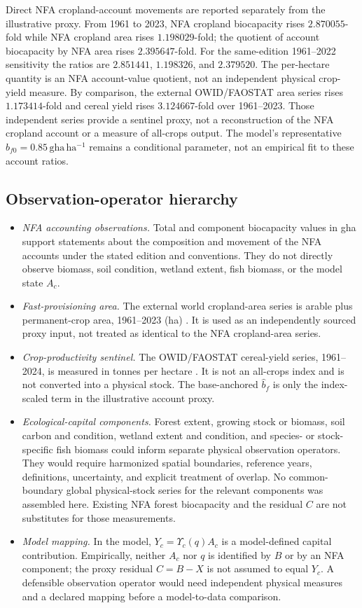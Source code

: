 \documentclass[11pt,a4paper]{article}
\newcommand{\Ups}{\Upsilon_c}
\begin{document}
Direct NFA cropland-account movements are reported separately from the illustrative proxy. From 1961 to 2023, NFA cropland biocapacity rises $2.870055$-fold while NFA cropland area rises $1.198029$-fold; the quotient of account biocapacity by NFA area rises $2.395647$-fold. For the same-edition 1961--2022 sensitivity the ratios are $2.851441$, $1.198326$, and $2.379520$. The per-hectare quantity is an NFA account-value quotient, not an independent physical crop-yield measure. By comparison, the external OWID/FAOSTAT area series rises $1.173414$-fold and cereal yield rises $3.124667$-fold over 1961--2023. Those independent series provide a sentinel proxy, not a reconstruction of the NFA cropland account or a measure of all-crops output. The model's representative $b_{f0}=0.85\,\mathrm{gha\,ha^{-1}}$ remains a conditional parameter, not an empirical fit to these account ratios.

\subsection{Observation-operator hierarchy}\label{si:operator}

\begin{itemize}[leftmargin=1.5em]
\item \emph{NFA accounting observations.} Total and component biocapacity values in gha support statements about the composition and movement of the NFA accounts under the stated edition and conventions. They do not directly observe biomass, soil condition, wetland extent, fish biomass, or the model state $A_c$.
\item \emph{Fast-provisioning area.} The external world cropland-area series is arable plus permanent-crop area, 1961--2023 (ha) \citep{OWIDCropland2026}. It is used as an independently sourced proxy input, not treated as identical to the NFA cropland-area series.
\item \emph{Crop-productivity sentinel.} The OWID/FAOSTAT cereal-yield series, 1961--2024, is measured in tonnes per hectare \citep{OWIDCereal2026}. It is not an all-crops index and is not converted into a physical stock. The base-anchored $\hat b_f$ is only the index-scaled term in the illustrative account proxy.
\item \emph{Ecological-capital components.} Forest extent, growing stock or biomass, soil carbon and condition, wetland extent and condition, and species- or stock-specific fish biomass could inform separate physical observation operators. They would require harmonized spatial boundaries, reference years, definitions, uncertainty, and explicit treatment of overlap. No common-boundary global physical-stock series for the relevant components was assembled here. Existing NFA forest biocapacity and the residual $C$ are not substitutes for those measurements.
\item \emph{Model mapping.} In the model, $Y_c=\Ups(q)A_c$ is a model-defined capital contribution. Empirically, neither $A_c$ nor $q$ is identified by $B$ or by an NFA component; the proxy residual $C=B-X$ is not assumed to equal $Y_c$. A defensible observation operator would need independent physical measures and a declared mapping before a model-to-data comparison.
\end{itemize}
\end{document}
